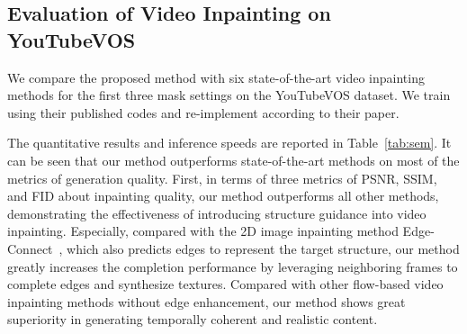\subsection{Evaluation of Video Inpainting on YouTubeVOS}
We compare the proposed method with six state-of-the-art video inpainting methods \cite{nazeri2019edgeconnect,wang2019video,Kim_2019_CVPR1,Xu_2019_CVPR,lee2019copy,oh2019onion}
for the first three mask settings on the YouTubeVOS dataset.
%
We train \cite{nazeri2019edgeconnect,Xu_2019_CVPR} using their published codes and re-implement \cite{wang2019video} according to their paper. 


The quantitative results and inference speeds are reported in Table~\ref{tab:sem}.
It can be seen that our method outperforms state-of-the-art methods on most of the metrics of generation quality.
First, in terms of three metrics of PSNR, SSIM, and FID about inpainting quality, our method outperforms all other methods, demonstrating the effectiveness of introducing structure guidance into video inpainting.
Especially, compared with the 2D image inpainting method Edge-Connect~\cite{nazeri2019edgeconnect}, which also predicts edges to represent the target structure, our method greatly increases the completion performance by leveraging neighboring frames to complete edges and synthesize textures. 
Compared with other flow-based video inpainting methods without edge enhancement, our method shows great superiority in generating temporally coherent and realistic content. 

